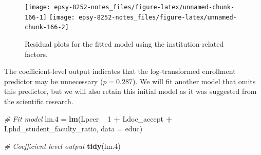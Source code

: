 \documentclass[]{book}
\newenvironment{Shaded}{\begin{snugshade}}{\end{snugshade}}
\newcommand{\CommentTok}[1]{\textcolor[rgb]{0.56,0.35,0.01}{\textit{#1}}}
\newcommand{\DataTypeTok}[1]{\textcolor[rgb]{0.13,0.29,0.53}{#1}}
\newcommand{\DecValTok}[1]{\textcolor[rgb]{0.00,0.00,0.81}{#1}}
\newcommand{\FloatTok}[1]{\textcolor[rgb]{0.00,0.00,0.81}{#1}}
\newcommand{\KeywordTok}[1]{\textcolor[rgb]{0.13,0.29,0.53}{\textbf{#1}}}
\newcommand{\NormalTok}[1]{#1}
\newcommand{\OperatorTok}[1]{\textcolor[rgb]{0.81,0.36,0.00}{\textbf{#1}}}
\newcommand{\StringTok}[1]{\textcolor[rgb]{0.31,0.60,0.02}{#1}}
\begin{document}
\begin{Shaded}
\end{Shaded}

\begin{figure}

{\centering \texttt{[image: epsy-8252-notes\_files/figure-latex/unnamed-chunk-166-1]} \texttt{[image: epsy-8252-notes\_files/figure-latex/unnamed-chunk-166-2]} 

}

\caption{Residual plots for the fitted model using the institution-related factors.}\label{fig:unnamed-chunk-166}
\end{figure}

The coefficient-level output indicates that the log-transformed enrollment predictor may be unnecessary (\(p=0.287\)). We will fit another model that omits this predictor, but we will also retain this initial model as it was suggested from the scientific research.

\begin{Shaded}
\begin{Highlighting}[]
\CommentTok{# Fit model}
\NormalTok{lm}\FloatTok{.4}\NormalTok{ =}\StringTok{ }\KeywordTok{lm}\NormalTok{(Lpeer }\OperatorTok{~}\StringTok{ }\DecValTok{1} \OperatorTok{+}\StringTok{ }\NormalTok{Ldoc_accept }\OperatorTok{+}\StringTok{ }\NormalTok{Lphd_student_faculty_ratio, }\DataTypeTok{data =}\NormalTok{ educ)}

\CommentTok{# Coefficient-level output}
\KeywordTok{tidy}\NormalTok{(lm}\FloatTok{.4}\NormalTok{)}
\end{Highlighting}
\end{Shaded}
\end{document}
